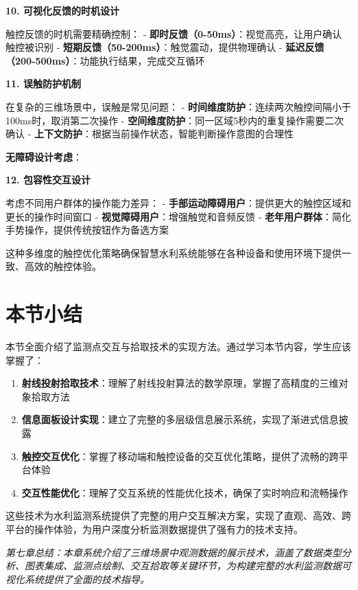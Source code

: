 \textbf{10. 可视化反馈的时机设计}

触控反馈的时机需要精确控制： - \textbf{即时反馈（0-50ms）}：视觉高亮，让用户确认触控被识别 - \textbf{短期反馈（50-200ms）}：触觉震动，提供物理确认 - \textbf{延迟反馈（200-500ms）}：功能执行结果，完成交互循环

\textbf{11. 误触防护机制}

在复杂的三维场景中，误触是常见问题： - \textbf{时间维度防护}：连续两次触控间隔小于100ms时，取消第二次操作 - \textbf{空间维度防护}：同一区域5秒内的重复操作需要二次确认 - \textbf{上下文防护}：根据当前操作状态，智能判断操作意图的合理性

\textbf{无障碍设计考虑}：

\textbf{12. 包容性交互设计}

考虑不同用户群体的操作能力差异： - \textbf{手部运动障碍用户}：提供更大的触控区域和更长的操作时间窗口 - \textbf{视觉障碍用户}：增强触觉和音频反馈 - \textbf{老年用户群体}：简化手势操作，提供传统按钮作为备选方案

这种多维度的触控优化策略确保智慧水利系统能够在各种设备和使用环境下提供一致、高效的触控体验。

\section{本节小结}

本节全面介绍了监测点交互与拾取技术的实现方法。通过学习本节内容，学生应该掌握了：

\begin{enumerate}
\def\labelenumi{\arabic{enumi}.}
\tightlist
\item
  \textbf{射线投射拾取技术}：理解了射线投射算法的数学原理，掌握了高精度的三维对象拾取方法
\item
  \textbf{信息面板设计实现}：建立了完整的多层级信息展示系统，实现了渐进式信息披露
\item
  \textbf{触控交互优化}：掌握了移动端和触控设备的交互优化策略，提供了流畅的跨平台体验
\item
  \textbf{交互性能优化}：理解了交互系统的性能优化技术，确保了实时响应和流畅操作
\end{enumerate}

这些技术为水利监测系统提供了完整的用户交互解决方案，实现了直观、高效、跨平台的操作体验，为用户深度分析监测数据提供了强有力的技术支持。

\emph{第七章总结：本章系统介绍了三维场景中观测数据的展示技术，涵盖了数据类型分析、图表集成、监测点绘制、交互拾取等关键环节，为构建完整的水利监测数据可视化系统提供了全面的技术指导。}
